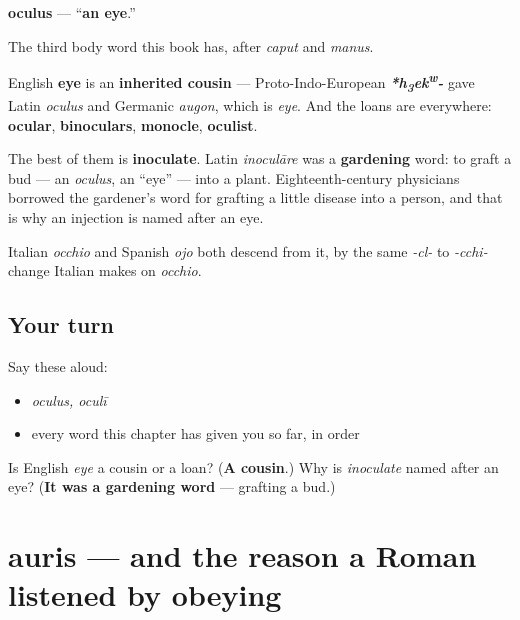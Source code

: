 \begin{cousinweb}
\textbf{oculus} — \textquotedblleft{}\textbf{an eye}.\textquotedblright{}

The third body word this book has, after \emph{caput} and \emph{manus}.

English \textbf{eye} is an \textbf{inherited cousin} — Proto-Indo-European \emph{\textbf{*h\textsubscript{3}ek\textsuperscript{w}-}} gave Latin \emph{oculus} and Germanic \emph{augon}, which is \emph{eye}. And the loans are everywhere: \textbf{ocular}, \textbf{binoculars}, \textbf{monocle}, \textbf{oculist}.

The best of them is \textbf{inoculate}. Latin \emph{inoculāre} was a \textbf{gardening} word: to graft a bud — an \emph{oculus}, an \textquotedblleft{}eye\textquotedblright{} — into a plant. Eighteenth-century physicians borrowed the gardener's word for grafting a little disease into a person, and that is why an injection is named after an eye.

Italian \emph{occhio} and Spanish \emph{ojo} both descend from it, by the same \emph{-cl-} to \emph{-cchi-} change Italian makes on \emph{occhio}.
\end{cousinweb}

\subsection*{Your turn}
Say these aloud:

\begin{itemize}
\raggedright
  \item \emph{oculus, oculī}
  \item every word this chapter has given you so far, in order
\end{itemize}

\begin{tcolorbox}[breakable,colback=teal!4,colframe=teal!35!black,title={Before you move on}]
Is English \emph{eye} a cousin or a loan? (\textbf{A cousin}.) Why is \emph{inoculate} named after an eye? (\textbf{It was a gardening word} — grafting a bud.)
\end{tcolorbox}
\section[auris, auris]{auris — and the reason a Roman listened by obeying}

\label{lesson:LA-C54-auris}



